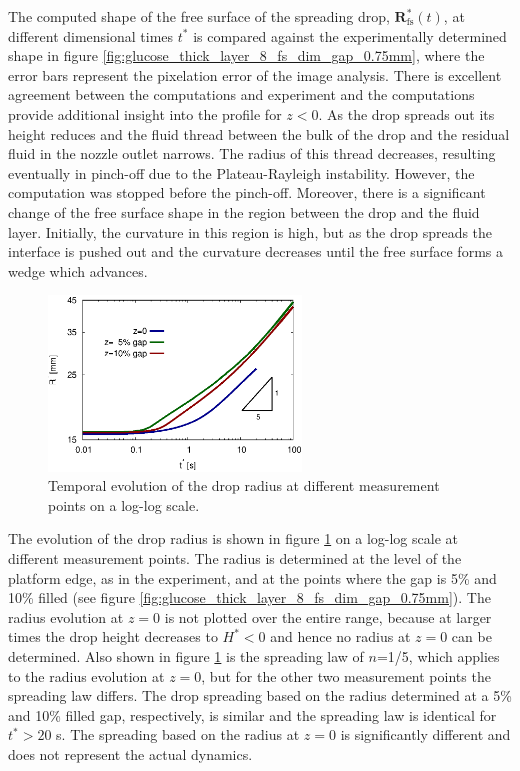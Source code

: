 \documentclass[aip,graphicx]{revtex4-1}
\newcommand{\sym}[1]{\text{#1}}
\newcommand{\vect}[1]{\bm{#1}}
\begin{document}
The computed shape of the free surface of the spreading drop, $\vect{R}^*_{\sym{fs}}(t)$, at different dimensional times $t^*$ is compared against the experimentally determined shape in figure \ref{fig:glucose_thick_layer_8_fs_dim_gap_0.75mm}, where the error bars represent the pixelation error of the image analysis.
There is excellent agreement between the computations and experiment and the computations provide additional insight into the profile for $z<0$.
As the drop spreads out its height reduces and the fluid thread between the bulk of the drop and the residual fluid in the nozzle outlet narrows.
The radius of this thread decreases, resulting eventually in pinch-off due to the Plateau-Rayleigh instability.
However, the computation was stopped before the pinch-off.
Moreover, there is a significant change of the free surface shape in the region between the drop and the fluid layer.
Initially, the curvature in this region is high, but as the drop spreads the interface is pushed out and the curvature decreases until the free surface forms a wedge which advances.

\begin{figure}[!ht]
\centering
\includegraphics[width=0.6\textwidth]{figures/radius_vs_time_measure_pos_dim.eps}
\caption{Temporal evolution of the drop radius at different measurement points on a log-log scale.}
\label{fig:glucose_thick_layer_8_radius_vs_time_non_dim}
\end{figure}

The evolution of the drop radius is shown in figure \ref{fig:glucose_thick_layer_8_radius_vs_time_non_dim} on a log-log scale at different measurement points.
The radius is determined at the level of the platform edge, as in the experiment, and at the points where the gap is 5\% and 10\% filled (see figure \ref{fig:glucose_thick_layer_8_fs_dim_gap_0.75mm}).
The radius evolution at $z=0$ is not plotted over the entire range, because at larger times the drop height decreases to $H^* < 0$ and hence no radius at $z=0$ can be determined.
Also shown in figure \ref{fig:glucose_thick_layer_8_radius_vs_time_non_dim} is the spreading law of $n$=1/5, which applies to the radius evolution at $z=0$, but for the other two measurement points the spreading law differs.
The drop spreading based on the radius determined at a 5\% and 10\% filled gap, respectively, is similar and the spreading law is identical for $t^*>20$ s.
The spreading based on the radius at $z=0$ is significantly different and does not represent the actual dynamics.
\end{document}
